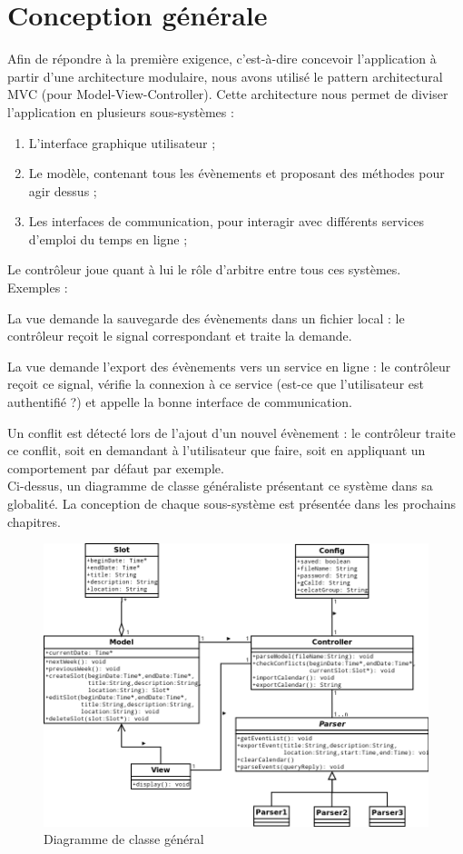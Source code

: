 \chapter{Conception générale}
	Afin de répondre à la première exigence, c'est-à-dire concevoir l'application à partir d'une architecture modulaire, nous avons utilisé le pattern architectural MVC (pour Model-View-Controller). Cette architecture nous permet de diviser l'application en plusieurs sous-systèmes :
	\begin{enumerate}
		\item L'interface graphique utilisateur ;
		\item Le modèle, contenant tous les évènements et proposant des méthodes pour agir dessus ;
		\item Les interfaces de communication, pour interagir avec différents services d'emploi du temps en ligne ;
	\end{enumerate}
	Le contrôleur joue quant à lui le rôle d'arbitre entre tous ces systèmes.\\
	Exemples :
	
	La vue demande la sauvegarde des évènements dans un fichier local : le contrôleur reçoit le signal correspondant et traite la demande.
	
	La vue demande l'export des évènements vers un service en ligne : le contrôleur reçoit ce signal, vérifie la connexion à ce service (est-ce que l'utilisateur est authentifié ?) et appelle la bonne interface de communication.
	
	Un conflit est détecté lors de l'ajout d'un nouvel évènement : le contrôleur traite ce conflit, soit en demandant à l'utilisateur que faire, soit en appliquant un comportement par défaut par exemple.\\
	
	Ci-dessus, un diagramme de classe généraliste présentant ce système dans sa globalité. La conception de chaque sous-système est présentée dans les prochains chapitres.
	\begin{figure}
		\centering
		\includegraphics[scale=0.55]{DiagrammeGL.png}
		\caption{Diagramme de classe général}
	\end{figure}
	\FloatBarrier

